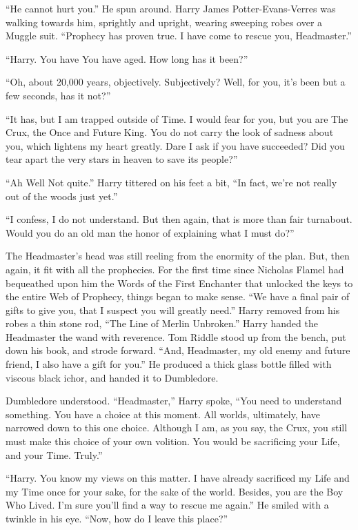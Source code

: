 “He cannot hurt you.” He spun around. Harry James Potter-Evans-Verres was walking towards him, sprightly and upright, wearing sweeping robes over a Muggle suit.  “Prophecy has proven true. I have come to rescue you, Headmaster.”

“Harry. You have{\el} You have aged. How long has it been?”

“Oh, about 20,000 years, objectively. Subjectively? Well, for you, it’s been but a few seconds, has it not?”

“It has, but I am trapped outside of Time. I would fear for you, but you are The Crux, the Once and Future King. You do not carry the look of sadness about you, which lightens my heart greatly. Dare I ask if you have succeeded? Did you tear apart the very stars in heaven to save its people?”

“Ah{\el} Well{\el} Not quite.” Harry tittered on his feet a bit, “In fact, we’re not really out of the woods just yet.”

“I confess, I do not understand. But then again, that is more than fair turnabout. Would you do an old man the honor of explaining what I must do?”
\simpleline
{}

The Headmaster’s head was still reeling from the enormity of the plan. But, then again, it fit with all the prophecies. For the first time since Nicholas Flamel had bequeathed upon him the Words of the First Enchanter that unlocked the keys to the entire Web of Prophecy, things began to make sense.
\SmallVSpace
“We have a final pair of gifts to give you, that I suspect you will greatly need.” Harry removed from his robes a thin stone rod, “The Line of Merlin Unbroken.” Harry handed the Headmaster the wand with reverence.
\SmallVSpace
Tom Riddle stood up from the bench, put down his book, and strode forward. “And, Headmaster, my old enemy and future friend, I also have a gift for you.” He produced a thick glass bottle filled with viscous black ichor, and handed it to Dumbledore.

Dumbledore understood.
\SmallVSpace
“Headmaster,” Harry spoke, “You need to understand something. You have a choice at this moment. All worlds, ultimately, have narrowed down to this one choice. Although I am, as you say, the Crux, you still must make this choice of your own volition. You would be sacrificing your Life, and your Time. Truly.”

“Harry. You know my views on this matter. I have already sacrificed my Life and my Time once for your sake, for the sake of the world. Besides, you are the Boy Who Lived. I’m sure you’ll find a way to rescue me again.” He smiled with a twinkle in his eye. “Now, how do I leave this place?”

